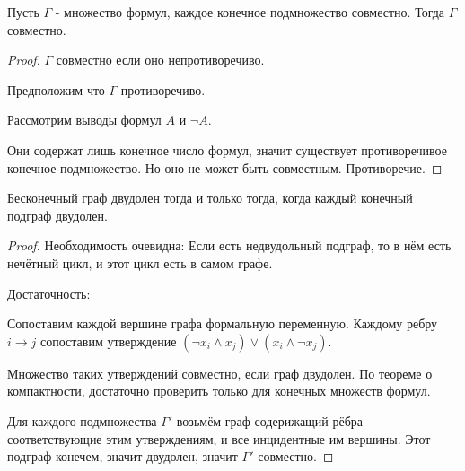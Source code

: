 \begin{theorem} \thmslashn

    Пусть $\Gamma$ - множество формул, каждое конечное подмножество совместно. Тогда $\Gamma$ совместно.
    \begin{proof} \thmslashn
    
        $\Gamma$ совместно если оно непротиворечиво.
        
        Предположим что $\Gamma$ противоречиво. 
        
        Рассмотрим выводы формул $A$ и $\neg A$.
    
        Они содержат лишь конечное число формул, значит существует противоречивое конечное подмножество. Но оно не может быть совместным. Противоречие.
    \end{proof}
\end{theorem}
\begin{theorem} \thmslashn

    Бесконечный граф двудолен тогда и только тогда, когда каждый конечный подграф двудолен.
    \begin{proof} \thmslashn
    
       Необходимость очевидна: Если есть недвудольный подграф, то в нём есть нечётный цикл, и этот цикл есть в самом графе.

        Достаточность:

        Сопоставим каждой вершине графа формальную переменную. Каждому ребру $i \to j$ сопоставим утверждение $(\neg x_{i} \land x_{j}) \lor (x_{i} \land \neg x_{j})$. 

        Множество таких утверждений совместно, если граф двудолен. По теореме о компактности, достаточно проверить только для конечных множеств формул.

        Для каждого подмножества $\Gamma'$ возьмём граф содерижащий рёбра соответствующие этим утверждениям, и все инцидентные им вершины. Этот подграф конечем, значит двудолен, значит $\Gamma'$ совместно.
    \end{proof}
\end{theorem}

